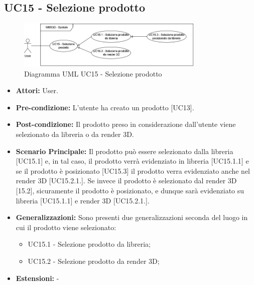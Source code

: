 \subsection{UC15 - Selezione prodotto}
\begin{figure}[H]
  \centering
  \includegraphics[width=0.8\textwidth]{UC_diagrams_11-20/UC15_sys.drawio.png}
   \caption{Diagramma UML UC15 - Selezione prodotto}
\end{figure}
\begin{itemize}
    \item \textbf{Attori:} User.
    \item \textbf{Pre-condizione:}  L'utente ha creato un prodotto [UC13].
    \item \textbf{Post-condizione:} Il prodotto preso in considerazione dall'utente viene selezionato da libreria o da render 3D.
    \item \textbf{Scenario Principale:} Il prodotto può essere selezionato dalla libreria [UC15.1] e, in tal caso, il prodotto verrà evidenziato in libreria [UC15.1.1] e se il prodotto è posizionato [UC15.3] il prodotto verra evidenziato anche nel render 3D [UC15.2.1.]. Se invece il prodotto è selezionato dal render 3D [15.2], sicuramente il prodotto è posizionato, e dunque sarà evidenziato su libreria [UC15.1.1] e render 3D [UC15.2.1.].
    \item \textbf{Generalizzazioni:} Sono presenti due generalizzazioni seconda del luogo in cui il prodotto viene selezionato:
    \begin{itemize}
        \item UC15.1 - Selezione prodotto da libreria;
        \item UC15.2 - Selezione prodotto da render 3D;
    \end{itemize}
    \item \textbf{Estensioni:} -
\end{itemize}



